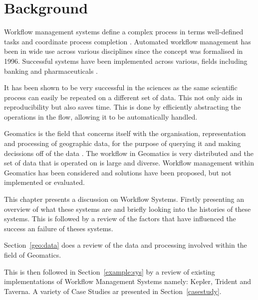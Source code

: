 \chapter{Background\label{chap1}}
    Workflow management systems define a complex process in terms well-defined
    tasks and coordinate process completion \cite{1245778}.  Automated
    workflow management has been in wide use across various disciplines since
    the concept was formalised in 1996\cite{springerlink:10.1007/BF00136712}.
    Successful systems have been implemented across various, fields including
    banking and pharmaceuticals
    \cite{Brahe:2007:SWW:1316624.1316661,5407993}.

    It has been shown to be very successful in the sciences as the same scientific
    process can easily be repeated on a different set of data\cite{4721191}.
    This not only aids in reproducibility but also saves time.  This is done by
    efficiently abstracting the operations in the flow, allowing it to be
    automatically handled.

    Geomatics is the field that concerns itself with the organisation,
    representation and processing of geographic data, for the purpose of
    querying it and making decissions off of the data
    \cite{DiMartino:2007:TAG:1341012.1341081}. The workflow in Geomatics is
    very distributed and the set of data that is operated on is large and
    diverse.  Workflow management within Geomatics has been considered and
    solutions have been proposed, but not implemented or
    evaluated\cite{Migliorini:2011:WTG:1999320.1999356}. 
 
    This chapter presents a discussion on Workflow Systems. Firstly presenting
    an overview of what these systems are and briefly looking into the histories
    of these systems. This is followed by a review of the factors that have influenced
    the success an failure of theses systems.

    Section~\ref{geo:data} does a review of the data and processing involved within
    the field of Geomatics. 

    This is then followed in Section~\ref{example:sys} by a review of existing implementations
    of Workflow Management Systems namely: Kepler, Trident and Taverna. A variety of Case Studies
    ar presented in Section~\ref{casestudy}.



